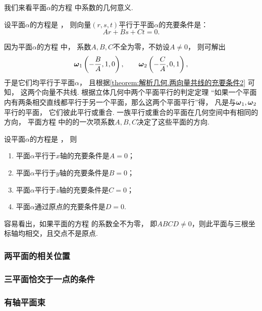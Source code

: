 我们来看平面\(\alpha\)的方程  中系数的几何意义.

\begin{theorem}
设平面\(\alpha\)的方程是 ，
则向量\((r,s,t)\)平行于平面\(\alpha\)的充要条件是：\[
	Ar+Bs+Ct = 0.
\]
\end{theorem}

因为平面\(\alpha\)的方程  中，
系数\(A,B,C\)不全为零，不妨设\(A\neq0\)，
则可解出\[
	\boldsymbol{\omega}_1 \left( -\frac{B}{A},1,0 \right), \qquad
	\boldsymbol{\omega}_2 \left( -\frac{C}{A},0,1 \right),
\]
于是它们均平行于平面\(\alpha\)，
且根据\cref{theorem:解析几何.两向量共线的充要条件2} 可知，
这两个向量不共线.
根据立体几何中两个平面平行的判定定理
“如果一个平面内有两条相交直线都平行于另一个平面，那么这两个平面平行”得，
凡是与\(\boldsymbol{\omega}_1,\boldsymbol{\omega}_2\)平行的平面，
它们彼此平行或重合.
一族平行或重合的平面在几何空间中有相同的方向，
平面方程  中的的一次项系数\(A,B,C\)决定了这些平面的方向.

\begin{corollary}
设平面\(\alpha\)的方程是 ，
则\begin{enumerate}
	\item 平面\(\alpha\)平行于\(x\)轴的充要条件是\(A=0\)；
	\item 平面\(\alpha\)平行于\(y\)轴的充要条件是\(B=0\)；
	\item 平面\(\alpha\)平行于\(z\)轴的充要条件是\(C=0\)；
	\item 平面\(\alpha\)通过原点的充要条件是\(D=0\).
\end{enumerate}
\end{corollary}

容易看出，如果平面的方程  的系数全不为零，
即\(ABCD\neq0\)，则此平面与三根坐标轴均相交，且交点不是原点.

\subsubsection{两平面的相关位置}

\subsubsection{三平面恰交于一点的条件}

\subsubsection{有轴平面束}


